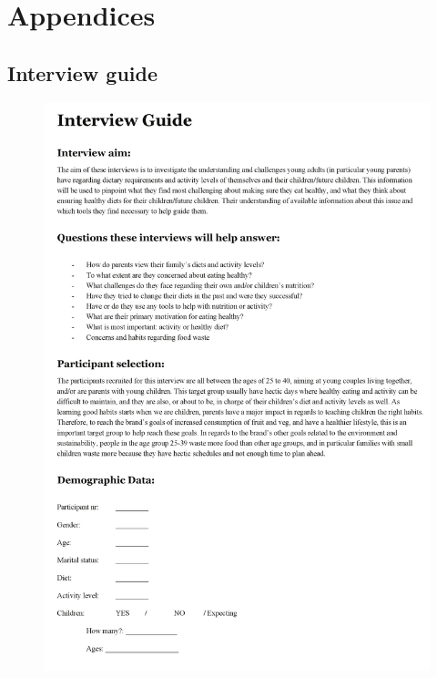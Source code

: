\chapter{Appendices}

\section{Interview guide}
    \label{interviewguide}
    
    \begin{figure}
        \centering
        \includegraphics[scale=0.8]{figures/intervguide.pdf}
    \end{figure}

